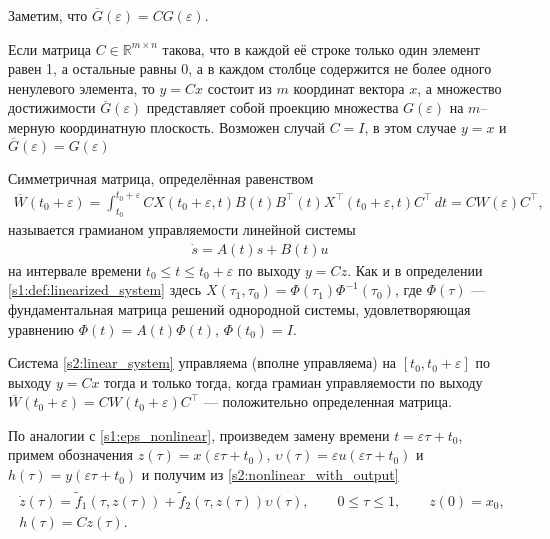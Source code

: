 \documentclass[../main.tex]{subfiles}
\begin{document}
Заметим, что $ \overline{G}(\varepsilon) = C G(\varepsilon) $. 
 
Если матрица $ C \in \mathbb{R}^{m \times n} $ такова, что в каждой её строке только один элемент равен 1, а остальные равны 0, а в каждом столбце содержится не более одного ненулевого элемента, то $ y=Cx $ состоит из $ m$ координат вектора $ x $, а множество достижимости $\overline{G}(\varepsilon)$ представляет собой проекцию множества $ G(\varepsilon) $ на $m$--мерную координатную плоскость. 
Возможен случай $C = I$, в этом случае $y = x$ и $ \overline{G}(\varepsilon) = G(\varepsilon)$


\begin{definition}
 Симметричная матрица, определённая равенством
 \begin{gather*}
 \overline{W}(t_0 + \varepsilon) = \int_{t_0}^{t_0+\varepsilon} C X(t_0+\varepsilon,t)B(t)B^{\top}(t)X^{\top}(t_0+\varepsilon,t) C^\top \, dt=CW(\varepsilon)C^\top,
 \end{gather*}
 называется грамианом управляемости линейной системы 
 \begin{gather}\label{s2:linear_system}
 	\dot{s} = A(t) s + B(t) u
 \end{gather}
 на интервале времени $ t_0 \leqslant t \leqslant t_0 + \varepsilon $ по выходу $y = C z$. 
 Как и в определении \ref{s1:def:linearized_system} здесь $X(\tau_1, \tau_0) = \Phi(\tau_1) \Phi^{−1}(\tau_0)$, где $\Phi(\tau)$ ---
 фундаментальная матрица решений однородной системы, удовлетворяющая уравнению
 $\Phi(t) = A(t) \Phi(t)$, $\Phi(t_0) = I$.
\end{definition}
 
Система \eqref{s2:linear_system} управляема (вполне управляема) на $ [t_0, t_0 + \varepsilon] $ по выходу $y=Cx$ тогда и только тогда,
когда грамиан управляемости по выходу $ \overline{W}(t_0 + \varepsilon) = C W(t_0 + \varepsilon) C^{\top} $ --- положительно определенная матрица.
 
 
По аналогии с \eqref{s1:eps_nonlinear}, произведем замену времени $t = \varepsilon \tau + t_0$, примем обозначения $z(\tau) = x(\varepsilon \tau + t_0)$, $ \upsilon(\tau) = \varepsilon u(\varepsilon \tau + t_0) $ и $h(\tau) = y(\varepsilon \tau + t_0)$ и получим из \eqref{s2:nonlinear_with_output}
\begin{gather}\label{s2:eps_nonlinear_with_output}
\begin{gathered}
	\dot{z}(\tau)=\widetilde{f}_1(\tau,z(\tau))+\widetilde{f}_2(\tau,z(\tau))\upsilon(\tau), \qquad 0 \leqslant \tau \leqslant 1, \qquad z(0) = x_0, \\
	h(\tau) = C z(\tau).
\end{gathered}
\end{gather}
\end{document}
